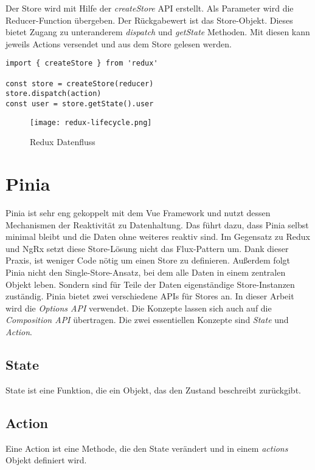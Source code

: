 Der Store wird mit Hilfe der \textit{createStore} API erstellt. Als Parameter wird die Reducer-Function übergeben. Der Rückgabewert ist das Store-Objekt. Dieses bietet Zugang zu unteranderem \textit{dispatch} und \textit{getState} Methoden. Mit diesen kann jeweils Actions versendet und aus dem Store gelesen werden.

\begin{lstlisting}
import { createStore } from 'redux'

const store = createStore(reducer)
store.dispatch(action)
const user = store.getState().user
\end{lstlisting}

\begin{figure}[h!]
  \texttt{[image: redux-lifecycle.png]}
  \caption{Redux Datenfluss}
  \label{fig:redux-lifecycle}
\end{figure}

\section{Pinia}

Pinia ist sehr eng gekoppelt mit dem Vue Framework und nutzt dessen Mechanismen der Reaktivität zu Datenhaltung. Das führt dazu, dass Pinia selbst minimal bleibt und die Daten ohne weiteres reaktiv sind. Im Gegensatz zu Redux und NgRx setzt diese Store-Lösung nicht das Flux-Pattern um. Dank dieser Praxis, ist weniger Code nötig um einen Store zu definieren. Außerdem folgt Pinia nicht den Single-Store-Ansatz, bei dem alle Daten in einem zentralen Objekt leben. Sondern sind für Teile der Daten eigenständige Store-Instanzen zuständig. Pinia bietet zwei verschiedene APIs für Stores an. In dieser Arbeit wird die \textit{Options API} verwendet. Die Konzepte lassen sich auch auf die \textit{Composition API} übertragen.\cite{piniaDefiningAStore} Die zwei essentiellen Konzepte sind \textit{State} und \textit{Action}.

\subsection{State}

State ist eine Funktion, die ein Objekt, das den Zustand beschreibt zurückgibt. 

\subsection{Action}

Eine Action ist eine Methode, die den State verändert und in einem \textit{actions} Objekt definiert wird.

